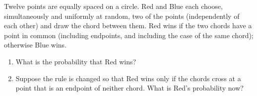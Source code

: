 Twelve points are equally spaced on a circle. Red and Blue each choose, simultaneously and uniformly at random, two of the points (independently of each other) and draw the chord between them. Red wins if the two chords have a point in common (including endpoints, and including the case of the same chord); otherwise Blue wins.
\begin{enumerate}
\item[(a)] What is the probability that Red wins?
\item[(b)] Suppose the rule is changed so that Red wins only if the chords cross at a point that is an endpoint of neither chord. What is Red's probability now?
\end{enumerate}
